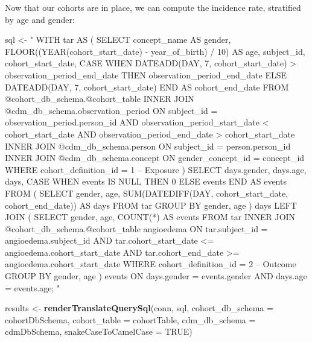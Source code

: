 \documentclass[11pt]{book}
\newenvironment{Shaded}{\begin{snugshade}}{\end{snugshade}}
\newcommand{\KeywordTok}[1]{\textcolor[rgb]{0.13,0.29,0.53}{\textbf{#1}}}
\newcommand{\DataTypeTok}[1]{\textcolor[rgb]{0.13,0.29,0.53}{#1}}
\newcommand{\StringTok}[1]{\textcolor[rgb]{0.31,0.60,0.02}{#1}}
\newcommand{\OtherTok}[1]{\textcolor[rgb]{0.56,0.35,0.01}{#1}}
\newcommand{\NormalTok}[1]{#1}
\theoremstyle{definition}
\theoremstyle{definition}
\theoremstyle{definition}
\theoremstyle{remark}
\begin{document}
Now that our cohorts are in place, we can compute the incidence rate,
stratified by age and gender:

\begin{Shaded}
\begin{Highlighting}[]
\NormalTok{sql <-}\StringTok{ "}
\StringTok{WITH tar AS (}
\StringTok{  SELECT concept_name AS gender,}
\StringTok{    FLOOR((YEAR(cohort_start_date) -}
\StringTok{          year_of_birth) / 10) AS age,}
\StringTok{    subject_id,}
\StringTok{    cohort_start_date,}
\StringTok{    CASE WHEN DATEADD(DAY, 7, cohort_start_date) >}
\StringTok{      observation_period_end_date}
\StringTok{    THEN observation_period_end_date}
\StringTok{    ELSE DATEADD(DAY, 7, cohort_start_date)}
\StringTok{    END AS cohort_end_date}
\StringTok{  FROM @cohort_db_schema.@cohort_table}
\StringTok{  INNER JOIN @cdm_db_schema.observation_period}
\StringTok{    ON subject_id = observation_period.person_id}
\StringTok{      AND observation_period_start_date < cohort_start_date}
\StringTok{      AND observation_period_end_date > cohort_start_date}
\StringTok{  INNER JOIN @cdm_db_schema.person}
\StringTok{    ON subject_id = person.person_id}
\StringTok{  INNER JOIN @cdm_db_schema.concept}
\StringTok{    ON gender_concept_id = concept_id}
\StringTok{  WHERE cohort_definition_id = 1 -- Exposure}
\StringTok{)}
\StringTok{SELECT days.gender,}
\StringTok{    days.age,}
\StringTok{    days,}
\StringTok{    CASE WHEN events IS NULL THEN 0 ELSE events END AS events}
\StringTok{FROM (}
\StringTok{  SELECT gender,}
\StringTok{    age,}
\StringTok{    SUM(DATEDIFF(DAY, cohort_start_date,}
\StringTok{      cohort_end_date)) AS days}
\StringTok{  FROM tar}
\StringTok{  GROUP BY gender,}
\StringTok{    age}
\StringTok{) days}
\StringTok{LEFT JOIN (}
\StringTok{  SELECT gender,}
\StringTok{      age,}
\StringTok{      COUNT(*) AS events}
\StringTok{  FROM tar}
\StringTok{  INNER JOIN @cohort_db_schema.@cohort_table angioedema}
\StringTok{    ON tar.subject_id = angioedema.subject_id}
\StringTok{      AND tar.cohort_start_date <= angioedema.cohort_start_date}
\StringTok{      AND tar.cohort_end_date >= angioedema.cohort_start_date}
\StringTok{  WHERE cohort_definition_id = 2 -- Outcome}
\StringTok{  GROUP BY gender,}
\StringTok{    age}
\StringTok{) events}
\StringTok{ON days.gender = events.gender}
\StringTok{  AND days.age = events.age;}
\StringTok{"}

\NormalTok{results <-}\StringTok{ }\KeywordTok{renderTranslateQuerySql}\NormalTok{(conn, sql,}
                                   \DataTypeTok{cohort_db_schema =}\NormalTok{ cohortDbSchema,}
                                   \DataTypeTok{cohort_table =}\NormalTok{ cohortTable,}
                                   \DataTypeTok{cdm_db_schema =}\NormalTok{ cdmDbSchema,}
                                   \DataTypeTok{snakeCaseToCamelCase =} \OtherTok{TRUE}\NormalTok{)}
\end{Highlighting}
\end{Shaded}
\end{document}

